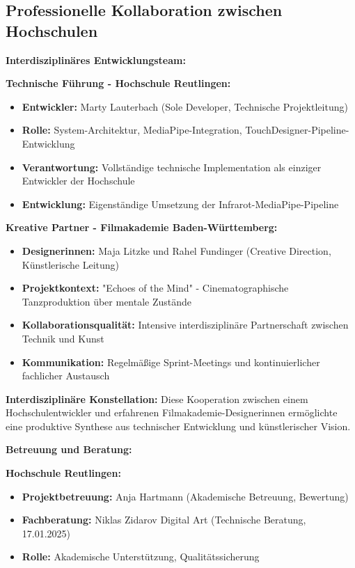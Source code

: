 \subsection{Professionelle Kollaboration zwischen Hochschulen}

\textbf{Interdisziplinäres Entwicklungsteam:}

\textbf{Technische Führung - Hochschule Reutlingen:}
\begin{itemize}
    \item \textbf{Entwickler:} Marty Lauterbach (Sole Developer, Technische Projektleitung)
    \item \textbf{Rolle:} System-Architektur, MediaPipe-Integration, TouchDesigner-Pipeline-Entwicklung
    \item \textbf{Verantwortung:} Vollständige technische Implementation als einziger Entwickler der Hochschule
    \item \textbf{Entwicklung:} Eigenständige Umsetzung der Infrarot-MediaPipe-Pipeline
\end{itemize}

\textbf{Kreative Partner - Filmakademie Baden-Württemberg:}
\begin{itemize}
    \item \textbf{Designerinnen:} Maja Litzke und Rahel Fundinger (Creative Direction, Künstlerische Leitung)
    \item \textbf{Projektkontext:} "Echoes of the Mind" - Cinematographische Tanzproduktion über mentale Zustände
    \item \textbf{Kollaborationsqualität:} Intensive interdisziplinäre Partnerschaft zwischen Technik und Kunst
    \item \textbf{Kommunikation:} Regelmäßige Sprint-Meetings und kontinuierlicher fachlicher Austausch
\end{itemize}

\textbf{Interdisziplinäre Konstellation:}
Diese Kooperation zwischen einem Hochschulentwickler und erfahrenen Filmakademie-Designerinnen ermöglichte eine produktive Synthese aus technischer Entwicklung und künstlerischer Vision.

\textbf{Betreuung und Beratung:}

\textbf{Hochschule Reutlingen:}
\begin{itemize}
    \item \textbf{Projektbetreuung:} Anja Hartmann (Akademische Betreuung, Bewertung)
    \item \textbf{Fachberatung:} Niklas Zidarov Digital Art (Technische Beratung, 17.01.2025)
    \item \textbf{Rolle:} Akademische Unterstützung, Qualitätssicherung
\end{itemize}

